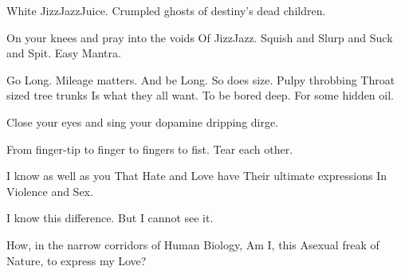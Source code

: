 \documentclass{article}
\begin{document}
White JizzJazzJuice. Crumpled ghosts of destiny's dead children.
\newline 
\newline

On your knees and  pray into the voids \newline Of JizzJazz. \newline
Squish and Slurp and Suck and Spit. \newline Easy Mantra. \newline
\newline


Go Long. Mileage matters. 
\newline 
And be Long. So does size. 
\newline 
Pulpy throbbing \newline Throat sized tree trunks \newline Is what they
all want. \newline To be bored deep. \newline For some hidden oil.
\newline \newline

Close your eyes and sing your dopamine dripping dirge. 
\newline
\newline

From finger-tip to finger to fingers to fist. Tear each other.
\newline
\newline

I know as well as you 
\newline
That Hate and Love have 
\newline
Their ultimate expressions 
\newline
In Violence and Sex. 
\newline

I know this difference.
\newline
But I cannot see it. 
\newline
\newline

How, in the narrow corridors of Human Biology, 
\newline 
Am I, this Asexual freak of Nature, to express my Love?
\end{document}
